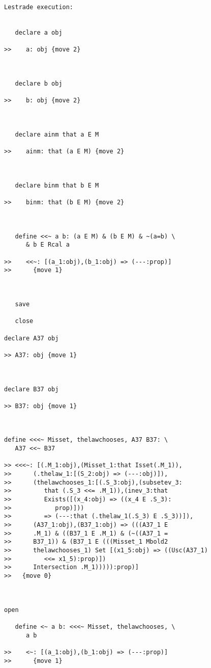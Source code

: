 \documentclass[12pt]{article}
\begin{document}
\begin{verbatim}Lestrade execution:


   declare a obj

>>    a: obj {move 2}



   declare b obj

>>    b: obj {move 2}



   declare ainm that a E M

>>    ainm: that (a E M) {move 2}



   declare binm that b E M

>>    binm: that (b E M) {move 2}



   define <<~ a b: (a E M) & (b E M) & ~(a=b) \
      & b E Rcal a

>>    <<~: [(a_1:obj),(b_1:obj) => (---:prop)]
>>      {move 1}



   save

   close

declare A37 obj

>> A37: obj {move 1}



declare B37 obj

>> B37: obj {move 1}



define <<<~ Misset, thelawchooses, A37 B37: \
   A37 <<~ B37

>> <<<~: [(.M_1:obj),(Misset_1:that Isset(.M_1)),
>>      (.thelaw_1:[(S_2:obj) => (---:obj)]),
>>      (thelawchooses_1:[(.S_3:obj),(subsetev_3:
>>         that (.S_3 <<= .M_1)),(inev_3:that
>>         Exists([(x_4:obj) => ((x_4 E .S_3):
>>            prop)]))
>>         => (---:that (.thelaw_1(.S_3) E .S_3))]),
>>      (A37_1:obj),(B37_1:obj) => (((A37_1 E
>>      .M_1) & ((B37_1 E .M_1) & (~((A37_1 =
>>      B37_1)) & (B37_1 E (((Misset_1 Mbold2
>>      thelawchooses_1) Set [(x1_5:obj) => ((Usc(A37_1)
>>         <<= x1_5):prop)])
>>      Intersection .M_1))))):prop)]
>>   {move 0}



open

   define <~ a b: <<<~ Misset, thelawchooses, \
      a b

>>    <~: [(a_1:obj),(b_1:obj) => (---:prop)]
>>      {move 1}


\end{verbatim}
\end{document}
